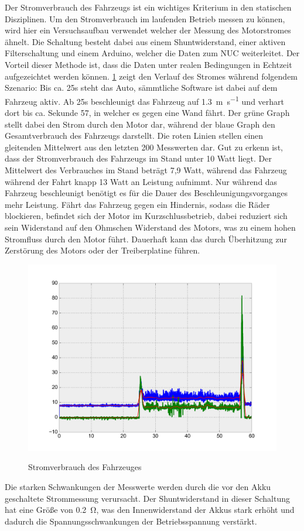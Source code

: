 Der Stromverbrauch des Fahrzeugs ist ein wichtiges Kriterium in den statischen Disziplinen. Um den Stromverbrauch im laufenden Betrieb messen zu können, wird hier ein Versuchsaufbau verwendet welcher der Messung des
Motorstromes ähnelt. Die Schaltung besteht dabei aus einem Shuntwiderstand, einer aktiven Filterschaltung und einem Arduino, welcher die Daten zum NUC weiterleitet. Der Vorteil dieser Methode ist, dass die Daten
unter realen Bedingungen in Echtzeit aufgezeichtet werden können. \cref{fig:power_consumption} zeigt den Verlauf des Stromes während folgendem Szenario: Bis ca. 25s steht das Auto, sämmtliche Software ist dabei auf 
dem Fahrzeug aktiv. Ab 25s beschleunigt das Fahrzeug auf \SI{1,3}{\metre\per\second} und verhart dort bis ca. Sekunde 57, in welcher es gegen eine Wand fährt. Der grüne Graph stellt dabei den Strom durch den Motor dar, während
der blaue Graph den Gesamtverbrauch des Fahrzeugs darstellt. Die roten Linien stellen einen gleitenden Mittelwert aus den letzten 200 Messwerten dar. Gut zu erkenn ist, dass der Stromverbrauch des Fahrzeugs im Stand unter 
10 Watt liegt. Der Mittelwert des Verbrauches im Stand beträgt 7,9 Watt, während das Fahrzeug während der Fahrt knapp 13 Watt an Leistung aufnimmt. Nur während das Fahrzeug beschleunigt benötigt es für die Dauer
des Beschleunigungsvorganges mehr Leistung. Fährt das Fahrzeug gegen ein Hindernis, sodass die Räder blockieren, befindet sich der Motor im Kurzschlussbetrieb, dabei reduziert sich sein Widerstand auf den Ohmschen Widerstand
des Motors, was zu einem hohen Stromfluss durch den Motor führt. Dauerhaft kann das durch Überhitzung zur Zerstörung des Motors oder der Treiberplatine führen.


\begin{figure}[H]
\centering
\includegraphics[width=.8\textwidth]{Strom/Power.png}\\
\caption{Stromverbrauch des Fahrzeuges}%
\label{fig:power_consumption}
\end{figure}


Die starken Schwankungen der Messwerte werden durch die vor den Akku geschaltete Strommessung verursacht. Der Shuntwiderstand in dieser Schaltung hat eine Größe von
\SI{0,2}{\ohm}, was den Innenwiderstand der Akkus stark erhöht und dadurch die Spannungsschwankungen der Betriebsspannung verstärkt. 

